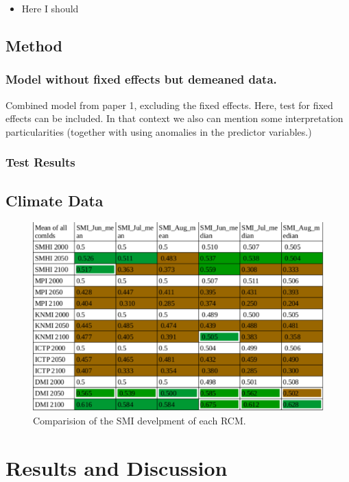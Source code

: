 \documentclass[12pt]{iopart}
\begin{document}
\begin{itemize}
\item Here I should 
\end{itemize}



\subsection{Method}
\subsubsection{Model without fixed effects but demeaned data.}
Combined model from paper 1, excluding the fixed effects. Here, test for fixed effects can be included. In that context we also can mention some interpretation particularities (together with using anomalies in the predictor variables.)

\subsubsection{Test Results}

\subsection{Climate Data}
\begin{figure}
	\label{climateData:1f}
	\centering
	\includegraphics[width=1\textwidth]{figures/MeanofSMI.pdf}
	\caption{Comparision of the SMI develpment of each RCM.}
\end{figure}

\section{Results and Discussion}
\end{document}
